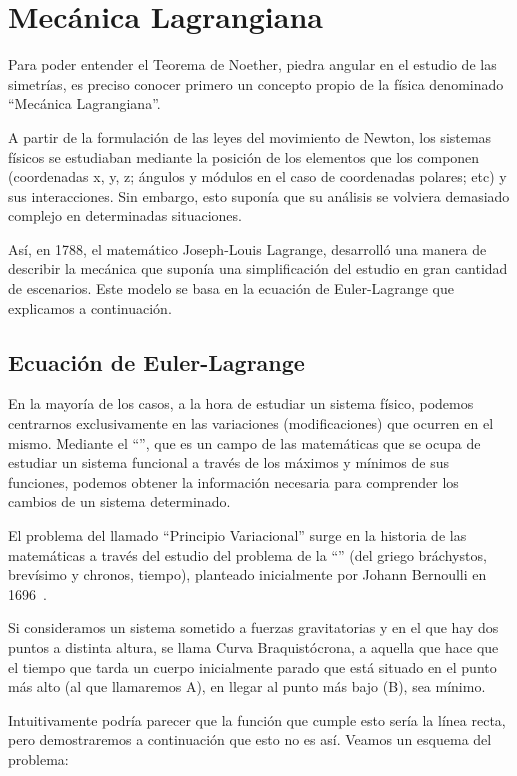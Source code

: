 \section{Mecánica Lagrangiana}\label{sec:mecánica-lagrangiana}
Para poder entender el Teorema de Noether, piedra angular en el estudio de las simetrías, es preciso conocer primero un concepto propio de la física denominado ``Mecánica Lagrangiana''.

A partir de la formulación de las leyes del movimiento de Newton, los sistemas físicos se estudiaban mediante la posición de los elementos que los componen (coordenadas x, y, z; ángulos y módulos en el caso de coordenadas polares; etc) y sus interacciones.
Sin embargo, esto suponía que su análisis se volviera demasiado complejo en determinadas situaciones.

Así, en 1788, el matemático Joseph-Louis Lagrange, desarrolló una manera de describir la mecánica que suponía una simplificación del estudio en gran cantidad de escenarios. Este modelo se basa en la ecuación de Euler-Lagrange que explicamos a continuación.

\subsection{Ecuación de Euler-Lagrange}\label{subsec:ecuación-de-euler-lagrange}
En la mayoría de los casos, a la hora de estudiar un sistema físico, podemos centrarnos exclusivamente en las variaciones (modificaciones) que ocurren en el mismo. Mediante el ``'', que es un campo de las matemáticas que se ocupa de estudiar un sistema funcional a través de los máximos y mínimos de sus funciones, podemos obtener la información necesaria para comprender los cambios de un sistema determinado.

El problema del llamado ``Principio Variacional'' surge en la historia de las matemáticas a través del estudio del problema de la ``'' (del griego bráchystos, brevísimo y chronos, tiempo), planteado inicialmente por Johann Bernoulli en 1696~\cite{AE}.

Si consideramos un sistema sometido a fuerzas gravitatorias y en el que hay dos puntos a distinta altura, se llama Curva Braquistócrona, a aquella que hace que el tiempo que tarda un cuerpo inicialmente parado que está situado en el punto más alto (al que llamaremos A), en llegar al punto más bajo (B), sea mínimo.

Intuitivamente podría parecer que la función que cumple esto sería la línea recta, pero demostraremos a continuación que esto no es así. Veamos un esquema del problema:

